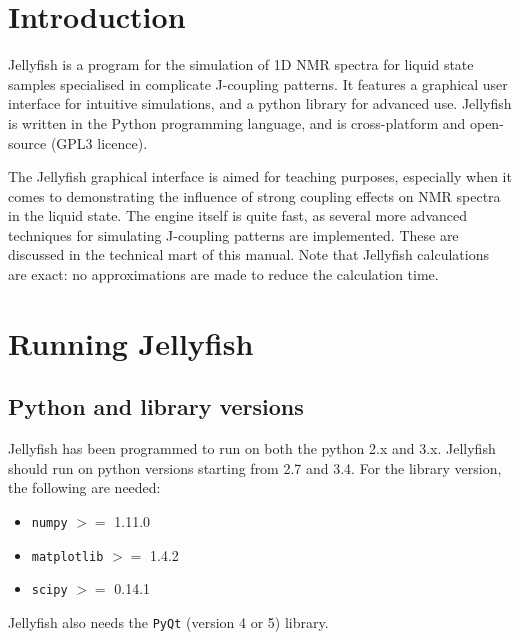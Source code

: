 \documentclass[11pt,a4paper]{article}
\renewcommand\cfttoctitlefont{\color{black!70}\Huge\fontfamily{SourceSansPro-LF}\bfseries}
\begin{document}


\thispagestyle{empty}
\newpage
\mbox{}


\renewcommand\cfttoctitlefont{\color{black}\Huge\fontfamily{SourceSansPro-LF}\bfseries}
\setcounter{tocdepth}{2}
\tableofcontents %

\renewcommand\cfttoctitlefont{\color{black!70}\Huge\fontfamily{SourceSansPro-LF}\bfseries}


\section{Introduction}
Jellyfish is a program for the simulation of 1D NMR spectra for liquid state samples specialised in
complicate J-coupling patterns. It features a graphical user interface for intuitive simulations,
and a python library for advanced use. Jellyfish is written in the Python programming
language, and is cross-platform and open-source (GPL3 licence).

The Jellyfish graphical interface is aimed for teaching purposes, especially when it comes to
demonstrating the influence of strong coupling effects on NMR spectra in the liquid state. The
engine itself is quite fast, as several more advanced techniques for simulating J-coupling patterns
are implemented. These are discussed in the technical mart of this manual. Note that Jellyfish
calculations are exact: no approximations are made to reduce the calculation time.


\section{Running Jellyfish}
\subsection{Python and library versions}
Jellyfish has been programmed to run on both the python 2.x and 3.x. Jellyfish should run on python
versions starting from 2.7 and 3.4.
For the library version, the following are needed:
\begin{itemize}
  \item  \texttt{numpy} $>=$ 1.11.0
  \item  \texttt{matplotlib} $>=$ 1.4.2
  \item  \texttt{scipy} $>=$ 0.14.1
\end{itemize}
Jellyfish also needs the \texttt{PyQt} (version 4 or 5) library.
\end{document}
